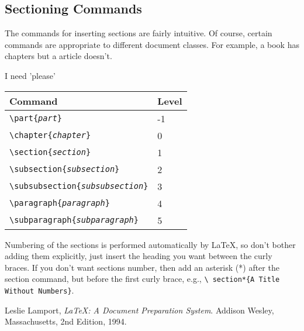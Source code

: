 \documentclass{article}
\begin{document}
\subsection{Sectioning Commands}
The commands for inserting sections are fairly intuitive. Of course,
certain commands are appropriate to different document classes.
For example, a book has chapters but a article doesn't.

I need 'please' %
\begin{center}
	\begin{tabular}{| l | l |}

		\hline %
		Command & Level \\ \hline %
		\texttt{\textbackslash part\{\emph{part}\}} & -1 \\
		\texttt{\textbackslash chapter\{\emph{chapter}\}} & 0 \\
		\texttt{\textbackslash section\{\emph{section}\}} & 1 \\
		\texttt{\textbackslash subsection\{\emph{subsection}\}} & 2 \\
		\texttt{\textbackslash subsubsection\{\emph{subsubsection}\}} & 3 \\
		\texttt{\textbackslash paragraph\{\emph{paragraph}\}} & 4 \\
		\texttt{\textbackslash subparagraph\{\emph{subparagraph}\}} & 5 \\
		\hline
	\end{tabular}
\end{center}

Numbering of the sections is performed automatically by \LaTeX{}, so don't
bother adding them explicitly, just insert the heading you want between
the curly braces. If you don't want sections number, then add an asterisk (*) after the
section command, but before the first curly brace, e.g., \texttt{\textbackslash
section*\{A Title Without Numbers\}}.

\begin{thebibliography}{9}
	 Leslie Lamport,
	 \emph{\LaTeX: A Document Preparation System}.
	 Addison Wesley, Massachusetts,
	 2nd Edition,
	 1994.

\end{thebibliography} %
\end{document}
